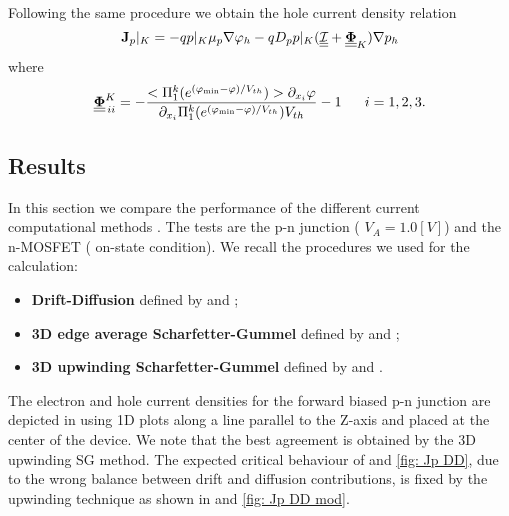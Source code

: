 Following the same procedure we obtain the hole current density relation
\vspace{0.2cm}
\begin{equation}
\label{eq:  Jp 3D upwin SG}
\mathbf{J}_p|_K = -qp|_K\mu_p\nabla \varphi_h - qD_pp|_K(\underline{\underline{\mathcal{I}}}+\underline{\underline{\mathbf{\Phi}}}_K) \nabla p_h
\end{equation}
\vspace{0.2cm}
where
 \begin{equation}
\underline{\underline{\vect{\Phi}}}^K_{\, ii}  = -\dfrac{<\Pi_1^k(e^{(\varphi_{\min}-\varphi)/V_{th}})> \partial_{x_i}\varphi}{\partial_{x_i}\Pi_1^k(e^{(\varphi_{\min}-\varphi)/V_{th}})V_{th}} -1 \psp{10} i = 1,2,3.
\end{equation}

\subsection{Results}

In this section we compare the performance of the different current computational methods . The tests are the p-n junction (  $V_A=1.0[V]$) and the n-MOSFET ( on-state condition). We recall the procedures we used for the calculation:
\begin{itemize}
\item {\bf Drift-Diffusion} defined by  and ;
\item {\bf 3D edge average Scharfetter-Gummel} defined by  and ;
\item {\bf 3D upwinding Scharfetter-Gummel} defined by  and .
\end{itemize}

The electron and hole current densities for the forward biased p-n junction are depicted in  using 1D plots along a line parallel to the Z-axis and placed at the center of the device. We note that the best agreement is obtained by the 3D upwinding SG method. The expected critical behaviour of  and \ref{fig: Jp DD}, due to the wrong balance between drift and diffusion contributions, is fixed by the upwinding technique as shown in  and \ref{fig: Jp DD mod}.

